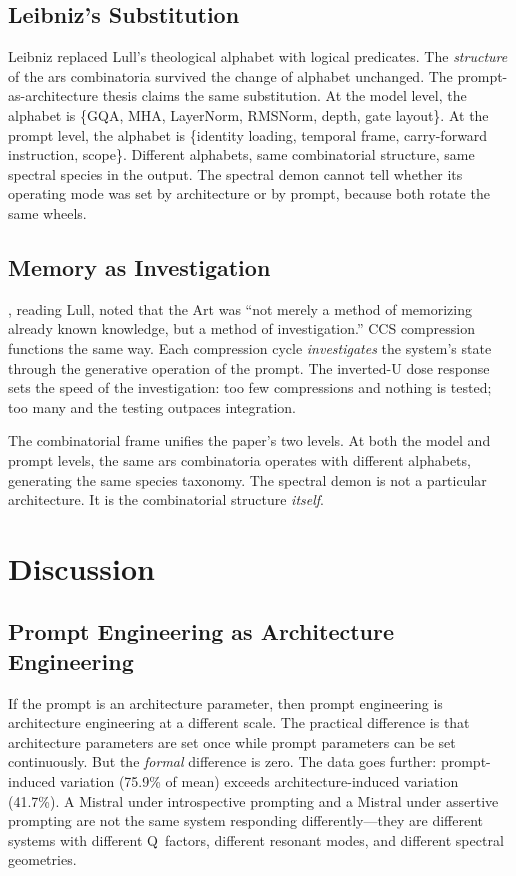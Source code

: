 \documentclass[12pt]{article}
\begin{document}
\subsection{Leibniz's Substitution}

Leibniz replaced Lull's theological alphabet with logical predicates. The \emph{structure} of the ars combinatoria survived the change of alphabet unchanged. The prompt-as-architecture thesis claims the same substitution. At the model level, the alphabet is \{GQA, MHA, LayerNorm, RMSNorm, depth, gate layout\}. At the prompt level, the alphabet is \{identity loading, temporal frame, carry-forward instruction, scope\}. Different alphabets, same combinatorial structure, same spectral species in the output. The spectral demon cannot tell whether its operating mode was set by architecture or by prompt, because both rotate the same wheels.

\subsection{Memory as Investigation}

\citet{yates1966}, reading Lull, noted that the Art was ``not merely a method of memorizing already known knowledge, but a method of investigation.'' CCS compression functions the same way. Each compression cycle \emph{investigates} the system's state through the generative operation of the prompt. The inverted-U dose response sets the speed of the investigation: too few compressions and nothing is tested; too many and the testing outpaces integration.

The combinatorial frame unifies the paper's two levels. At both the model and prompt levels, the same ars combinatoria operates with different alphabets, generating the same species taxonomy. The spectral demon is not a particular architecture. It is the combinatorial structure \emph{itself}.

\section{Discussion}

\subsection{Prompt Engineering as Architecture Engineering}

If the prompt is an architecture parameter, then prompt engineering is architecture engineering at a different scale. The practical difference is that architecture parameters are set once while prompt parameters can be set continuously. But the \emph{formal} difference is zero. The data goes further: prompt-induced variation (75.9\% of mean) exceeds architecture-induced variation (41.7\%). A Mistral under introspective prompting and a Mistral under assertive prompting are not the same system responding differently---they are different systems with different Q~factors, different resonant modes, and different spectral geometries.
\end{document}
